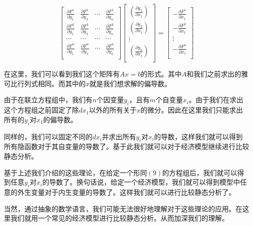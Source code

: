 \documentclass[UTF8,12pt]{ctexart}
\numberwithin{equation}{section} %
\numberwithin{figure}{section}
\numberwithin{table}{section}
\begin{document}
	\begin{equation}
		\begin{bmatrix}
			\frac{\partial F^1}{\partial y_1} & \frac{\partial F^1}{\partial y_2} & \cdots & \frac{\partial F^1}{\partial y_n} \\
			\frac{\partial F^2}{\partial y_1} & \frac{\partial F^2}{\partial y_2} & \cdots & \frac{\partial F^2}{\partial y_n} \\
			\cdots & \cdots & \cdots & \cdots \\
			\frac{\partial F^n}{\partial y_1} & \frac{\partial F^n}{\partial y_2} & \cdots & \frac{\partial F^n}{\partial y_n} \\
		\end{bmatrix}
		\begin{bmatrix}
			(\frac{\partial y_1}{\partial x_1}) \\
			(\frac{\partial y_2}{\partial x_1}) \\
			\vdots \\
			(\frac{\partial y_n}{\partial x_1}) \\
		\end{bmatrix}
		=
		\begin{bmatrix}
			-\frac{\partial F^1}{\partial x_1} \\
			-\frac{\partial F^2}{\partial x_1} \\
			\vdots \\
			-\frac{\partial F^n}{\partial x_1} \\
		\end{bmatrix}
	\end{equation}
	
	在这里，我们可以看到我们这个矩阵有$Ax=b$的形式。其中$A$和我们之前求出的雅可比行列式相同。而其中的$x$就是我们想求解的偏导数。
	
	由于在联立方程组中，我们有$n$个因变量$y_i$，且有$m$个自变量$x_i$。由于我们在求出这个方程组之前固定了除$dx_1$以外的所有关于$x$的微分。因此在这里我们只能求出所有的$y_i$对$x_1$的偏导数。
	
	同样的，我们可以固定不同的$dx_i$并求出所有$y_i$对$x_i$的导数，这样我们就可以得到所有隐函数对于其自变量的导数了。基于此我们就可以对于经济模型继续进行比较静态分析。
	
	基于上述我们介绍的这些理论，在给定一个形同$(9)$的方程组后，我们就可以得到任意$y_i$对$x_i$的导数了。换句话说，给定一个经济模型，我们就可以得到模型中任意的外生变量对于内生变量的导数了。这样我们就可以进行比较静态分析了。
	
	当然，通过抽象的数学语言，我们可能无法很好地理解对于这些理论的应用。在这里我们就用一个常见的经济模型进行比较静态分析。从而加深我们的理解。
	
\end{document}
